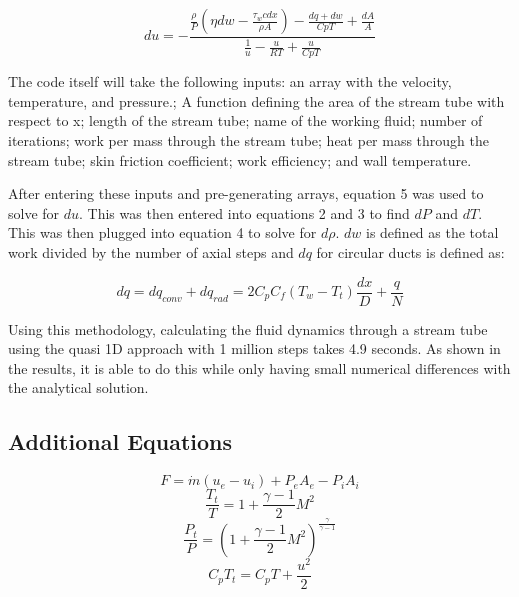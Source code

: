 \documentclass[conf]{new-aiaa}
\begin{document}
\begin{equation}
    du = -
    \frac{\frac{\rho}{P}\left(\eta dw - \frac{\tau_w c dx}{\rho A}\right)
    - \frac{dq+dw}{Cp T} + \frac{dA}{A}}
    {\frac{1}{u}-\frac{u}{R T} + \frac{u}{Cp T}}
\end{equation}

The code itself will take the following inputs: an array with the velocity, temperature, and pressure.;
A function defining the area of the stream tube with respect to x;
length of the stream tube;
name of the working fluid;
number of iterations;
work per mass through the stream tube;
heat per mass through the stream tube;
skin friction coefficient;
work efficiency;
and wall temperature. 


After entering these inputs and pre-generating arrays, equation 5 was used to solve for $du$. 
This was then entered into equations 2 and 3 to find $dP$ and $dT$.
This was then plugged into equation 4 to solve for $d\rho$. 
$dw$ is defined as the total work divided by the number of axial steps and $dq$ for circular ducts is defined as:

\begin{equation}
    dq = dq_{conv} + dq_{rad} =  
    2 C_p C_f \left(T_w - T_t\right)\frac{dx}{D} + \frac{q}{N}
\end{equation}

Using this methodology, calculating the fluid dynamics through a stream tube using the quasi 1D approach with 1 million steps takes 4.9 seconds.
As shown in the results, it is able to do this while only having small numerical differences with the analytical solution.
\pagebreak 


\subsection{Additional Equations}

\begin{equation}
    F = \dot{m} \left(u_e - u_i\right)+ P_e A_e - P_i A_i
\end{equation} 
\begin{equation}
    \frac{T_t}{T} = 1 + \frac{\gamma-1}{2} M^2
\end{equation} 
\begin{equation}
    \frac{P_t}{P} = \left(1 + \frac{\gamma-1}{2} M^2\right)^{\frac{\gamma}{\gamma-1}}
\end{equation} 
\begin{equation}
    C_p T_t = C_p T + \frac{u^2}{2}
\end{equation}
\end{document}
